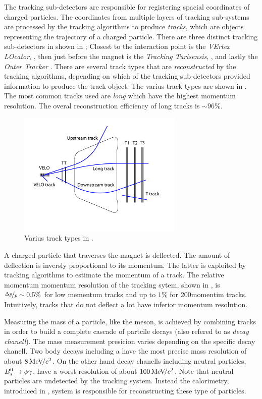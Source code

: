The tracking sub-detectors are responsible for registering spacial coordinates of charged particles.
The coordinates from multiple layers of tracking sub-systems are processed by the tracking algorithms
to produce {\it tracks}, which are objects representing the trajectory of a charged particle. There are
three distinct tracking sub-detectors in \lhcb shown in ; Closest to the interaction point is
the {\it VErtex LOcator}, \velo, then just before the \lhcb magnet is the {\it Tracking Turisensis}, \ttracker,
and  lastly the {\it Outer Tracker} \ot. There are several track types that are {\it reconstructed} by
the tracking algorithms, depending on which of the tracking sub-detectors provided information to produce
the track object. The varius track types are shown in . The most common tracks used are {\it long}
which have the highest momentum resolution. The overal reconstruction efficiency of long tracks is $\sim 96\%$.

\begin{figure}[t]
  \centering
  \includegraphics[width=0.7\textwidth]{Figures/Chapter2/trackTypesRunIAndII}
  \caption{Varius track types in \lhcb.}
  \label{track_types}
\end{figure}

A charged particle that traverses the \lhcb magnet is deflected. The amount of deflection is inversly proportional
to its momentum. The latter is exploited by tracking algorithms to estimate the momentum of a track. The relative
momentum momentum resolution of the tracking sytem, shown in , is $\nicefrac{\Delta p}{p} \sim 0.5 \%$
for low mementum tracks and up to $1\%$ for 200\gevc momentim tracks. Intuitively, tracks that do not deflect a
lot have inferior momentum resolution.

Measuring the mass of a particle, like the \Bs meson, is achieved by combining tracks in order to build a complete
cascade of partcile decays (also refered to as {\it decay chanell}). The mass measurement presicion varies depending
on the specific decay chanell. Two body \B decays including a \jpsi have the most precise mass resolution of about
$8 {\mathrm{\,Me\kern -0.1em V\!/}c^2}$. On the other hand decay chanells including neutral particles, \ie $B^0_s\rightarrow\phi\gamma$, have a worst resolution of
about $100 {\mathrm{\,Me\kern -0.1em V\!/}c^2}$. Note that neutral particles are undetected by the tracking system. Instead the calorimetry,
introduced in , system is responsible for reconstructing these type of particles.

